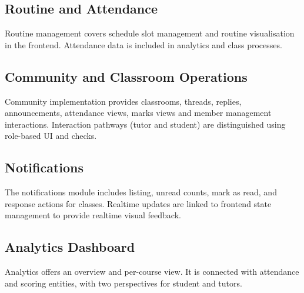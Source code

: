 \subsection{Routine and Attendance}
Routine management covers schedule slot management and routine visualisation in the frontend. Attendance
data is included in analytics and class processes.

\subsection{Community and Classroom Operations}
Community implementation provides classrooms, threads, replies, announcements, attendance views, marks views and member
management interactions. Interaction pathways (tutor and student) are distinguished using role-based UI and checks.

\subsection{Notifications}
The notifications module includes listing, unread counts, mark as read, and response actions for classes.
Realtime updates are linked to frontend state management to provide realtime visual feedback.

\subsection{Analytics Dashboard}
Analytics offers an overview and per-course view. It is connected with attendance and scoring entities,
with two perspectives for student and tutors.

